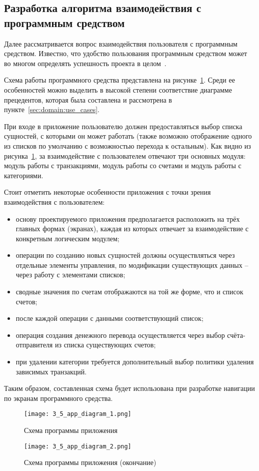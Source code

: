 \subsection{Разработка алгоритма взаимодействия с программным средством}
\label{sec:design:app}

Далее рассматривается вопрос взаимодействия пользователя с программным средством.
Известно, что удобство пользования программным средством может во многом определять успешность проекта в целом~\cite[с.~44]{code_complete}.

Схема работы программного средства представлена на рисунке~\ref{fig:design:app:diagram}.
Среди ее особенностей можно выделить в высокой степени соответствие диаграмме прецедентов, которая была составлена и рассмотрена в пункте~\ref{sec:domain:use_cases}.

При входе в приложение пользователю должен предоставляться выбор списка сущностей, с которыми он может работать (также возможно отображение одного из списков по умолчанию с возможностью перехода к остальным).
Как видно из рисунка~\ref{fig:design:app:diagram}, за взаимодействие с пользователем отвечают три основных модуля: модуль работы с транзакциями, модуль работы со счетами и модуль работы с категориями.

Стоит отметить некоторые особенности приложения с точки зрения взаимодействия с пользователем:
\begin{itemize}
    \item основу проектируемого приложения предполагается расположить на трёх главных формах (экранах), каждая из которых отвечает за взаимодействие с конкретным логическим модулем;
    \item операции по созданию новых сущностей должны осуществляться через отдельные элементы управления, по модификации существующих данных -- через работу с элементами списков;
    \item сводные значения по счетам отображаются на той же форме, что и список счетов;
    \item после каждой операции с данными соответствующий список;
    \item операция создания денежного перевода осуществляется через выбор счёта-отправителя из списка существующих счетов;
    \item при удалении категории требуется дополнительный выбор политики удаления зависимых транзакций.
\end{itemize}

Таким образом, составленная схема будет использована при разработке навигации по экранам программного средства.

\begin{figure}[p]
    \centering
    \texttt{[image: 3\_5\_app\_diagram\_1.png]}
    \caption{Схема программы приложения}
    \label{fig:design:app:diagram}
\end{figure}

\begin{sidewaysfigure}
    \centering
    \ContinuedFloat
    \texttt{[image: 3\_5\_app\_diagram\_2.png]}
    \caption{Схема программы приложения (окончание)}
\end{sidewaysfigure}

